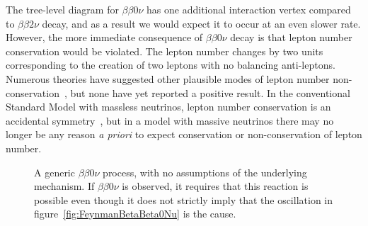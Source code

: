 The tree-level diagram for $\beta\beta 0\nu$ has one additional interaction vertex compared to $\beta\beta 2\nu$ decay, and as a result we would expect it to occur at an even slower rate.  However, the more immediate consequence of $\beta\beta 0\nu$ decay is that lepton number conservation would be violated.  The lepton number changes by two units corresponding to the creation of two leptons with no balancing anti-leptons.  Numerous theories have suggested other plausible modes of lepton number non-conservation~\cite{ProtonDecay}\cite{MuonToPositron}, but none have yet reported a positive result.  In the conventional Standard Model with massless neutrinos, lepton number conservation is an accidental symmetry~\cite{LeptonConservation}, but in a model with massive neutrinos there may no longer be any reason \textit{a priori} to expect conservation or non-conservation of lepton number.

\begin{figure}
\begin{center}
\end{center}
\caption{A generic $\beta\beta 0\nu$ process, with no assumptions of the underlying mechanism.  If $\beta\beta 0\nu$ is observed, it requires that this reaction is possible even though it does not strictly imply that the oscillation in figure~\ref{fig:FeynmanBetaBeta0Nu} is the cause.}
\label{fig:FeynmanBetaBeta0NuBlob}
\end{figure}

